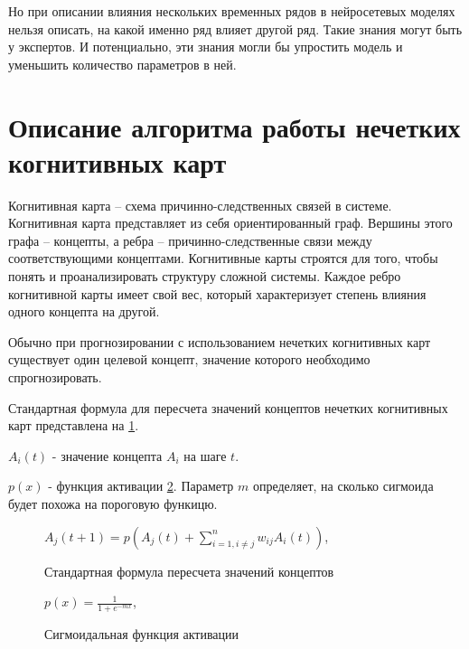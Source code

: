 Но при описании влияния нескольких временных рядов в нейросетевых моделях
нельзя описать, на какой именно ряд влияет другой ряд. Такие знания могут быть у
экспертов. И потенциально, эти знания могли бы упростить модель и уменьшить количество
параметров в ней.



\section{Описание алгоритма работы нечетких когнитивных карт}

Когнитивная карта – схема причинно-следственных связей в системе.
Когнитивная карта представляет из себя ориентированный граф.
Вершины этого графа – концепты, а ребра – причинно-следственные связи между соответствующими концептами.
Когнитивные карты строятся для того, чтобы понять и проанализировать структуру сложной системы.
Каждое ребро когнитивной карты имеет свой вес, который характеризует степень влияния одного концепта на другой.

Обычно при прогнозировании с использованием нечетких когнитивных карт существует один целевой концепт,
значение которого необходимо спрогнозировать.


Стандартная формула для пересчета значений концептов нечетких когнитивных карт представлена на
\ref{img:concepts_recalc}.

$ A_i(t) $ - значение концепта $A_i$ на шаге $t$.

$ p(x) $ - функция активации \ref{img:sigmiog_actiovation}. Параметр $m$ определяет, на сколько сигмоида будет похожа на пороговую функицю.

\def\figurename{Формула}
\begin{figure}[t]
	\centering
	$ A_j(t+1) = p( A_j(t) + \sum_{i = 1, i \neq j}^{n} w_{ij} A_i(t) ) $,
	\caption{Стандартная формула пересчета значений концептов}
	\label{img:concepts_recalc}
\end{figure}
\noindent

\begin{figure}[t]
	\centering
	$ p(x) = \frac {1} {1+ e^{-mx} } $,
	\caption{Сигмоидальная функция активации}
	\label{img:sigmiog_actiovation}
\end{figure}
\def\figurename{Рис.}

